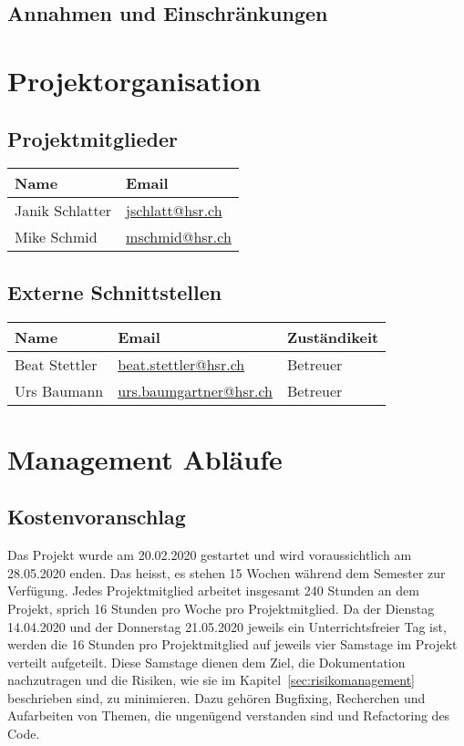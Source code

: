 \documentclass[
	ngerman,
	toc=listof, %
	toc=bibliography, %
	footnotes=multiple, %
	parskip=half, %
	numbers=noendperiod %
]{scrartcl}
\begin{document}
	\subsection{Annahmen und Einschränkungen}

\section{Projektorganisation}

	\subsection{Projektmitglieder}
		\begin{tabularx}{0.9\textwidth}{lX}
			\toprule
			Name & Email \\
			\midrule
			Janik Schlatter & \url{jschlatt@hsr.ch} \\
			Mike Schmid & \url{mschmid@hsr.ch} \\
			\bottomrule
		\end{tabularx}

	\subsection{Externe Schnittstellen}
		\begin{tabularx}{0.9\textwidth}{lXl}
			\toprule
			Name & Email & Zuständikeit \\
			\midrule
			Beat Stettler & \url{beat.stettler@hsr.ch} & Betreuer \\
			Urs Baumann & \url{urs.baumgartner@hsr.ch} & Betreuer \\
			\bottomrule
		\end{tabularx}

\section{Management Abläufe}

	\subsection{Kostenvoranschlag}

		Das Projekt wurde am 20.02.2020 gestartet und wird voraussichtlich am 28.05.2020 enden.
		Das heisst, es stehen 15 Wochen während dem Semester zur Verfügung. 
		Jedes Projektmitglied arbeitet insgesamt 240 Stunden an dem Projekt, sprich 16 Stunden pro Woche pro Projektmitglied.
		Da der Dienstag 14.04.2020 und der Donnerstag 21.05.2020 jeweils ein Unterrichtsfreier Tag ist, werden die 16 Stunden pro Projektmitglied auf jeweils vier Samstage im Projekt verteilt aufgeteilt.
		Diese Samstage dienen dem Ziel, die Dokumentation nachzutragen und die Risiken, wie sie im Kapitel~\ref{sec:risikomanagement} beschrieben sind, zu minimieren. 
		Dazu gehören Bugfixing, Recherchen und Aufarbeiten von Themen, die ungenügend verstanden sind und Refactoring des Code.
\end{document}
